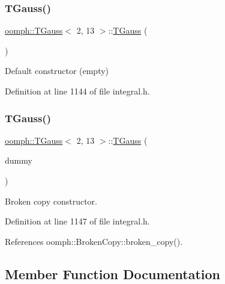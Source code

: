 \subsubsection{\texorpdfstring{T\+Gauss()}{TGauss()}\hspace{0.1cm}{\footnotesize\ttfamily [1/2]}}
{\footnotesize\ttfamily \hyperlink{classoomph_1_1TGauss}{oomph\+::\+T\+Gauss}$<$ 2, 13 $>$\+::\hyperlink{classoomph_1_1TGauss}{T\+Gauss} (\begin{DoxyParamCaption}{ }\end{DoxyParamCaption})\hspace{0.3cm}{\ttfamily [inline]}}



Default constructor (empty) 



Definition at line 1144 of file integral.\+h.

\mbox{\label{classoomph_1_1TGauss_3_012_00_0113_01_4_a56d5a6b4356807fa0d9dced8cab85613}} 
\subsubsection{\texorpdfstring{T\+Gauss()}{TGauss()}\hspace{0.1cm}{\footnotesize\ttfamily [2/2]}}
{\footnotesize\ttfamily \hyperlink{classoomph_1_1TGauss}{oomph\+::\+T\+Gauss}$<$ 2, 13 $>$\+::\hyperlink{classoomph_1_1TGauss}{T\+Gauss} (\begin{DoxyParamCaption}\item[{const \hyperlink{classoomph_1_1TGauss}{T\+Gauss}$<$ 2, 13 $>$ \&}]{dummy }\end{DoxyParamCaption})\hspace{0.3cm}{\ttfamily [inline]}}



Broken copy constructor. 



Definition at line 1147 of file integral.\+h.



References oomph\+::\+Broken\+Copy\+::broken\+\_\+copy().



\subsection{Member Function Documentation}
\mbox{\label{classoomph_1_1TGauss_3_012_00_0113_01_4_ac6b91d246d1ac23b89f0a56569b76944}} 
